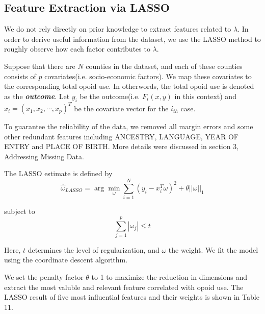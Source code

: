 
\subsection{Feature Extraction via LASSO}
We do not rely directly on prior knowledge to extract features related to $\lambda$. In order to derive useful information from the dataset, we use the LASSO method to roughly observe how each factor contributes to $\lambda$. 

Suppose that there are $N$ counties in the dataset, and each of these counties consists of $p$ covariates(i.e. socio-economic factors). We map these covariates to the corresponding total opoid use. In otherwords, the total opoid use is denoted as the \textbf{ \itshape outcome}. Let $y_i$ be the outcome(i.e. $F_i(x,y)$ in this context) and $x_i = (x_1, x_2, \cdots, x_p)^T$ be the covariate vector for the $i_{th}$ case.

To guarantee the reliability of the data, we removed all margin errors and some other redundant features including ANCESTRY, LANGUAGE, YEAR OF ENTRY and PLACE OF BIRTH. More details were discussed in section 3, Addressing Missing Data.

The LASSO estimate is defined by\cite{7}
\begin{equation}
\hat{\omega}_{LASSO}=
\arg\min_{\omega} \sum_{i=1}^{N}(y_i - x_i^T\omega)^2 + \theta||\omega||_1
\end{equation}

subject to
\begin{equation}
 \sum_{j=1}^{p}|\omega_j|\leq t
\end{equation}

Here, $t$ determines the level of regularization, and $\omega$ the weight. We fit the model using the coordinate descent algorithm. \cite{6}

We set the penalty factor $\theta$ to 1 to maximize the reduction in dimensions and extract the most valuble and relevant feature correlated with opoid use. The LASSO result of five most influential features and their weights is shown in Table 11.

